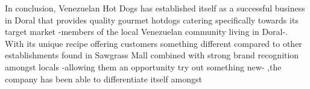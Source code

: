 In conclusion, Venezuelan Hot Dogs has established itself as a successful business in Doral that provides quality gourmet hotdogs catering specifically towards its target market -members of the local Venezuelan community living in Doral-. With its unique recipe offering customers something different compared to other establishments found in Sawgrass Mall combined with strong brand recognition amongst locals -allowing them an opportunity try out something new- ,the company has been able to differentiate itself amongst